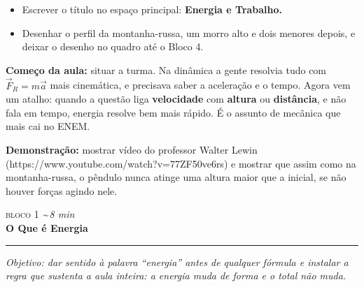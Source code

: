\documentclass[11pt,a4paper]{article}
\newcommand{\bloco}[3]{%
  \needspace{7\baselineskip}
  \vspace{1.8em}
  {\scshape\color{vinho}bloco #1}\hfill
    {\small\itshape\color{grafite}\textasciitilde\,#3 min}\\[0.1em]
  {\Large\bfseries #2}\\[-0.55em]
  {\color{black!30}\rule{\linewidth}{0.5pt}}
  \par\nobreak\smallskip
}
\newcommand{\objetivo}[1]{{\itshape\color{grafite}Objetivo: #1}\par\smallskip}
\begin{document}
\begin{quadro}
\begin{itemize}[nosep]
  \item Escrever o t\'itulo no espa\c{c}o principal:
        \textbf{Energia e Trabalho.}
  \item Desenhar o perfil da montanha-russa, um morro alto e dois
        menores depois, e deixar o desenho no quadro at\'e o Bloco 4.
\end{itemize}
\end{quadro}

\begin{obs}
\textbf{Come\c{c}o da aula:} situar a turma. Na din\^amica a gente
resolvia tudo com $\vec{F}_R = m\vec{a}$ mais cinem\'atica, e precisava
saber a acelera\c{c}\~ao e o tempo. Agora vem um atalho: quando a
quest\~ao liga \textbf{velocidade} com \textbf{altura} ou
\textbf{dist\^ancia}, e n\~ao fala em tempo, energia resolve bem mais
r\'apido. \'E o assunto de mec\^anica que mais cai no ENEM.

\textbf{Demonstra\c{c}\~ao:} mostrar vídeo do professor Walter Lewin (https://www.youtube.com/watch?v=77ZF50ve6rs)
e mostrar que assim como na montanha-russa, o pêndulo nunca atinge uma altura maior que a inicial,
se não houver forças agindo nele.
\end{obs}

\bloco{1}{O Que \'e Energia}{8}

\objetivo{dar sentido \`a palavra ``energia'' antes de qualquer
f\'ormula e instalar a regra que sustenta a aula inteira: a energia
muda de forma e o total n\~ao muda.}
\end{document}
